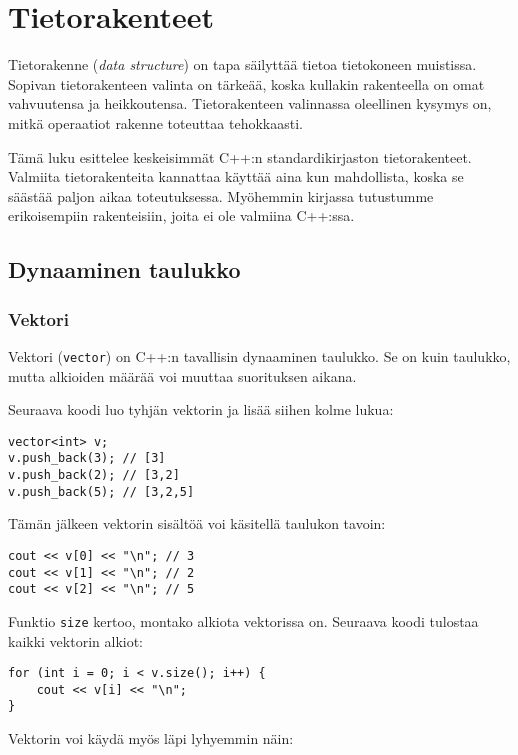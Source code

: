 \chapter{Tietorakenteet}

Tietorakenne (\textit{data structure})
on tapa säilyttää tietoa tietokoneen muistissa.
Sopivan tietorakenteen valinta on tärkeää,
koska kullakin rakenteella on omat
vahvuutensa ja heikkoutensa.
Tietorakenteen valinnassa oleellinen kysymys on,
mitkä operaatiot rakenne toteuttaa tehokkaasti.

Tämä luku esittelee keskeisimmät
C++:n standardikirjaston tietorakenteet.
Valmiita tietorakenteita kannattaa käyttää
aina kun mahdollista, 
koska se säästää paljon aikaa toteutuksessa.
Myöhemmin kirjassa tutustumme erikoisempiin
rakenteisiin, joita ei ole valmiina C++:ssa.

\section{Dynaaminen taulukko}

\subsection{Vektori}

Vektori (\texttt{vector})
on C++:n tavallisin dynaaminen taulukko.
Se on kuin taulukko, mutta alkioiden
määrää voi muuttaa suorituksen aikana.

Seuraava koodi luo tyhjän vektorin
ja lisää siihen kolme lukua:

\begin{lstlisting}
vector<int> v;
v.push_back(3); // [3]
v.push_back(2); // [3,2]
v.push_back(5); // [3,2,5]
\end{lstlisting}

Tämän jälkeen vektorin sisältöä voi käsitellä taulukon tavoin:

\begin{lstlisting}
cout << v[0] << "\n"; // 3
cout << v[1] << "\n"; // 2
cout << v[2] << "\n"; // 5
\end{lstlisting}

Funktio \texttt{size} kertoo, montako alkiota vektorissa on.
Seuraava koodi tulostaa kaikki vektorin alkiot:

\begin{lstlisting}
for (int i = 0; i < v.size(); i++) {
    cout << v[i] << "\n";
}
\end{lstlisting}

Vektorin voi käydä myös läpi lyhyemmin näin:

